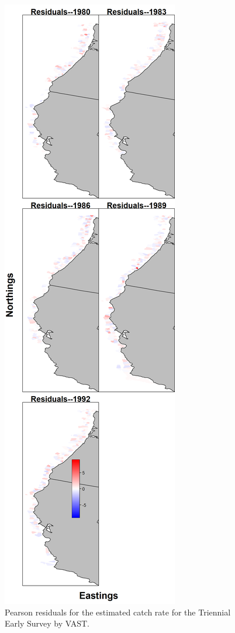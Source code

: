 \documentclass[12pt,]{article}
\begin{document}
\FloatBarrier

\begin{figure}
\centering
\includegraphics{Figures/tri_early_maps--catchrate_pearson_resid.png}
\caption{Pearson residuals for the estimated catch rate for the
Triennial Early Survey by VAST. \label{fig:tri_early_catch_rate}}
\end{figure}
\end{document}
